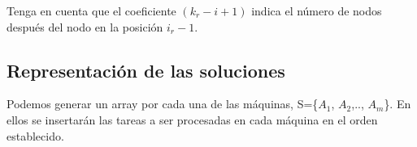 Tenga en cuenta que el coeficiente $(k_{r} - i + 1)$ indica el n\'umero de nodos despu\'es del nodo en la posici\'on $i_r-1 $.



\subsection{Representaci\'on de las soluciones}

Podemos generar un array por cada una de las m\'aquinas, S=\{$A_1$, $A_2$,.., $A_m$\}. En ellos se insertar\'an las tareas a ser procesadas en cada m\'aquina en el orden establecido. 


